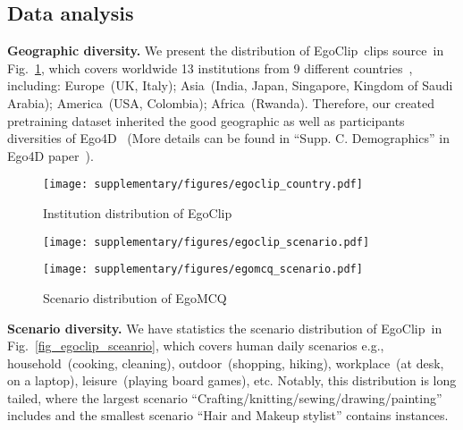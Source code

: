 \documentclass{article}
\newcommand{\dataset}{EgoClip}
\newcommand{\eval}{EgoMCQ}
\begin{document}
\subsection{Data analysis}\label{a3}
\noindent\textbf{Geographic diversity.}
We present the distribution of \dataset~clips source~in Fig.~\ref{fig_egoclip_country}, which covers worldwide 13 institutions from 9 different countries~\cite{grauman2021ego4d}, including:
Europe~(UK, Italy);
Asia~(India, Japan, Singapore, Kingdom of Saudi Arabia);
America~(USA, Colombia);
Africa~(Rwanda).
Therefore, our created pretraining dataset inherited the good geographic as well as participants diversities of Ego4D~
(More details can be found in ``Supp. C. Demographics'' in Ego4D paper~\cite{grauman2021ego4d}).
\begin{figure}[htb]
\vspace{-0.25cm}
    \centering
    \texttt{[image: supplementary/figures/egoclip\_country.pdf]}
    \caption{Institution distribution of \dataset}
    \label{fig_egoclip_country}
\vspace{-0.5cm}
\end{figure} \newpage

\begin{figure}[H]
\centering
\begin{minipage}[t]{0.45\textwidth}
\centering
\texttt{[image: supplementary/figures/egoclip\_scenario.pdf]}
\caption{Scenario distribution of \dataset}
\label{fig_egoclip_sceanrio}
\end{minipage}
\quad
\begin{minipage}[t]{0.45\textwidth}
\centering
\texttt{[image: supplementary/figures/egomcq\_scenario.pdf]}
\caption{Scenario distribution of \eval}
\label{case_1}
\end{minipage}
\centering
\label{fig_egomcq_sceanrio}
\end{figure} 
\noindent\textbf{Scenario diversity.}
We have statistics the scenario distribution of \dataset~in Fig.~\ref{fig_egoclip_sceanrio}, which covers  human daily scenarios e.g., household~(cooking, cleaning), outdoor~(shopping, hiking), workplace~(at desk, on a laptop), leisure~(playing board games), etc.
Notably, this distribution is long tailed, where the largest scenario ``Crafting/knitting/sewing/drawing/painting'' includes  and the smallest scenario ``Hair and Makeup stylist'' contains  instances.
\end{document}
